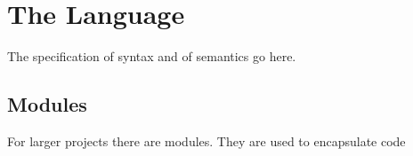 
\section{The Language}

The specification of syntax and of semantics go here.

\subsection{Modules}

For larger projects there are modules. They are used to encapsulate code
